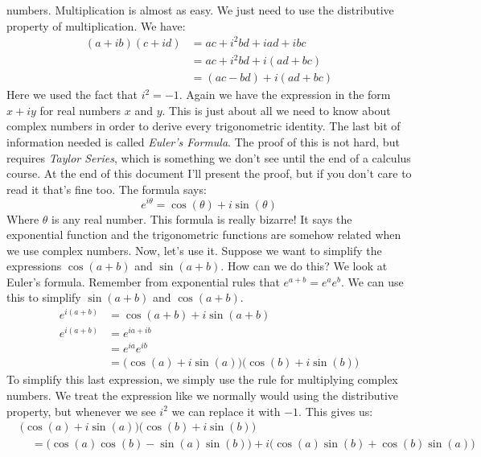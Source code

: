 \documentclass{article}
\begin{document}
    numbers. Multiplication is almost as easy. We just need to use the
    distributive property of multiplication. We have:
    \begin{align}
        (a+ib)(c+id)
            &=ac+i^{2}bd+iad+ibc\\
            &=ac+i^{2}bd+i(ad+bc)\\
            &=(ac-bd)+i(ad+bc)
    \end{align}
    Here we used the fact that $i^{2}=-1$. Again we have the expression in the
    form $x+iy$ for real numbers $x$ and $y$. This is just about all we need to
    know about complex numbers in order to derive every trigonometric identity.
    The last bit of information needed is called \textit{Euler's Formula}.
    The proof of this is not hard, but requires \textit{Taylor Series}, which
    is something we don't see until the end of a calculus course. At the end of
    this document I'll present the proof, but if you don't care to read it
    that's fine too. The formula says:
    \begin{equation}
        e^{i\theta}=\cos(\theta)+i\sin(\theta)
    \end{equation}
    Where $\theta$ is any real number. This formula is really bizarre! It says
    the exponential function and the trigonometric functions are somehow
    related when we use complex numbers. Now, let's use it. Suppose we want to
    simplify the expressions $\cos(a+b)$ and $\sin(a+b)$. How can we do this?
    We look at Euler's formula. Remember from exponential rules that
    $e^{a+b}=e^{a}e^{b}$. We can use this to simplify $\sin(a+b)$ and
    $\cos(a+b)$.
    \begin{align}
        e^{i(a+b)}&=\cos(a+b)+i\sin(a+b)\tag{Euler's Formula}\\
        e^{i(a+b)}&=e^{ia+ib}\tag{Distribute $i$}\\
            &=e^{ia}e^{ib}\tag{Exponential Property}\\
            &=\big(\cos(a)+i\sin(a)\big)\big(\cos(b)+i\sin(b)\big)
                \tag{Euler's Formula}
    \end{align}
    To simplify this last expression, we simply use the rule for multiplying
    complex numbers. We treat the expression like we normally would using the
    distributive property, but whenever we see $i^{2}$ we can replace it with
    $-1$. This gives us:
    \begin{align}
        &\big(\cos(a)+i\sin(a)\big)\big(\cos(b)+i\sin(b)\big)\nonumber\\
        &\quad=\big(\cos(a)\cos(b)-\sin(a)\sin(b)\big)+
            i\big(\cos(a)\sin(b)+\cos(b)\sin(a)\big)
    \end{align}
\end{document}
